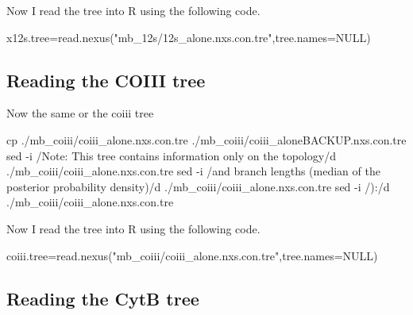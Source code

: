 \documentclass[
]{article}
\newenvironment{Shaded}{\begin{snugshade}}{\end{snugshade}}
\newcommand{\AttributeTok}[1]{\textcolor[rgb]{0.77,0.63,0.00}{#1}}
\newcommand{\ConstantTok}[1]{\textcolor[rgb]{0.00,0.00,0.00}{#1}}
\newcommand{\FunctionTok}[1]{\textcolor[rgb]{0.00,0.00,0.00}{#1}}
\newcommand{\NormalTok}[1]{#1}
\newcommand{\OtherTok}[1]{\textcolor[rgb]{0.56,0.35,0.01}{#1}}
\newcommand{\StringTok}[1]{\textcolor[rgb]{0.31,0.60,0.02}{#1}}
\begin{document}
Now I read the tree into R using the following code.

\begin{Shaded}
\begin{Highlighting}[]
\NormalTok{x12s.tree}\OtherTok{=}\FunctionTok{read.nexus}\NormalTok{(}\StringTok{"mb\_12s/12s\_alone.nxs.con.tre"}\NormalTok{,}\AttributeTok{tree.names=}\ConstantTok{NULL}\NormalTok{)}
\end{Highlighting}
\end{Shaded}

\hypertarget{reading-the-coiii-tree}{%
\subsection{Reading the COIII tree}\label{reading-the-coiii-tree}}

Now the same or the coiii tree

\begin{Shaded}
\begin{Highlighting}[]
\FunctionTok{cp}\NormalTok{ ./mb\_coiii/coiii\_alone.nxs.con.tre ./mb\_coiii/coiii\_aloneBACKUP.nxs.con.tre}
\FunctionTok{sed} \AttributeTok{{-}i} \StringTok{\textquotesingle{}/Note: This tree contains information only on the topology/d\textquotesingle{}}\NormalTok{ ./mb\_coiii/coiii\_alone.nxs.con.tre}
\FunctionTok{sed} \AttributeTok{{-}i} \StringTok{\textquotesingle{}/and branch lengths (median of the posterior probability density)/d\textquotesingle{}}\NormalTok{ ./mb\_coiii/coiii\_alone.nxs.con.tre}
\FunctionTok{sed} \AttributeTok{{-}i} \StringTok{\textquotesingle{}/):/d\textquotesingle{}}\NormalTok{ ./mb\_coiii/coiii\_alone.nxs.con.tre}
\end{Highlighting}
\end{Shaded}

Now I read the tree into R using the following code.

\begin{Shaded}
\begin{Highlighting}[]
\NormalTok{coiii.tree}\OtherTok{=}\FunctionTok{read.nexus}\NormalTok{(}\StringTok{"mb\_coiii/coiii\_alone.nxs.con.tre"}\NormalTok{,}\AttributeTok{tree.names=}\ConstantTok{NULL}\NormalTok{)}
\end{Highlighting}
\end{Shaded}

\hypertarget{reading-the-cytb-tree}{%
\subsection{Reading the CytB tree}\label{reading-the-cytb-tree}}
\end{document}
